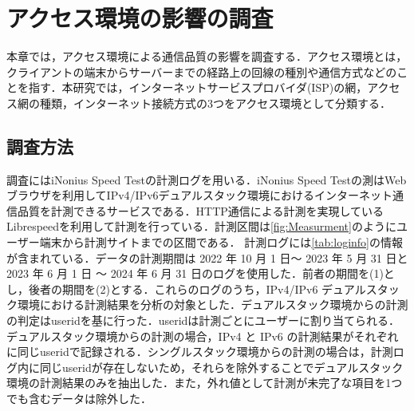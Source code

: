 
\chapter{アクセス環境の影響の調査}
\label{chap:access}
本章では，アクセス環境による通信品質の影響を調査する．アクセス環境とは，クライアントの端末からサーバーまでの経路上の回線の種別や通信方式などのことを指す．本研究では，インターネットサービスプロバイダ(ISP)の網，アクセス網の種類，インターネット接続方式の3つをアクセス環境として分類する．
\section{調査方法}
調査にはiNonius Speed Test\cite{iNonius}の計測ログを用いる．iNonius Speed Testの測はWebブラウザを利用してIPv4/IPv6デュアルスタック環境におけるインターネット通信品質を計測できるサービスである．HTTP通信による計測を実現しているLibrespeed\cite{librespeed}を利用して計測を行っている．計測区間は\cref{fig:Measurment}のようにユーザー端末から計測サイトまでの区間である．
計測ログには\cref{tab:loginfo}の情報が含まれている．データの計測期間は 2022 年 10 月 1 日〜 2023 年 5 月 31 日と 2023 年 6 月 1 日 〜 2024 年 6 月 31 日のログを使用した．前者の期間を(1)とし，後者の期間を(2)とする．これらのログのうち，IPv4/IPv6 デュアルスタック環境における計測結果を分析の対象とした．デュアルスタック環境からの計測の判定はuseridを基に行った．useridは計測ごとにユーザーに割り当てられる．デュアルスタック環境からの計測の場合，IPv4 と IPv6 の計測結果がそれぞれに同じuseridで記録される．シングルスタック環境からの計測の場合は，計測ログ内に同じuseridが存在しないため，それらを除外することでデュアルスタック環境の計測結果のみを抽出した．また，外れ値として計測が未完了な項目を1つでも含むデータは除外した．

